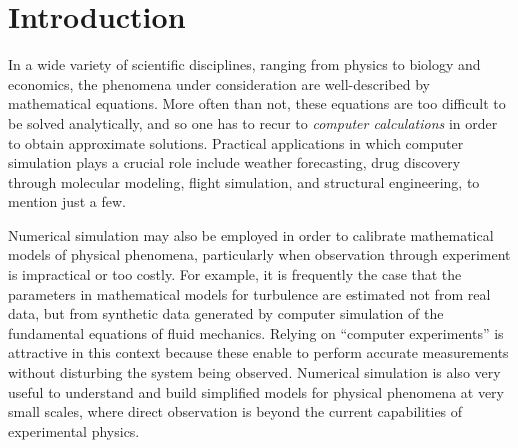 \chapter*{Introduction}%
In a wide variety of scientific disciplines,
ranging from physics to biology and economics,
the phenomena under consideration are well-described by mathematical equations.
More often than not,
these equations are too difficult to be solved analytically,
and so one has to recur to \emph{computer calculations} in order to obtain approximate solutions.
Practical applications in which computer simulation plays a crucial role include
weather forecasting, drug discovery through molecular modeling,
flight simulation, and structural engineering, to mention just a few.


Numerical simulation may also be employed in order to calibrate mathematical models of physical phenomena,
particularly when observation through experiment is impractical or too costly.
For example, it is frequently the case that the parameters in mathematical models for turbulence are estimated not from real data,
but from synthetic data generated by computer simulation of the fundamental equations of fluid mechanics.
Relying on ``computer experiments'' is attractive in this context because
these enable to perform accurate measurements without disturbing the system being observed.
Numerical simulation is also very useful to understand and build simplified models for physical phenomena at very small scales,
where direct observation is beyond the current capabilities of experimental physics.

